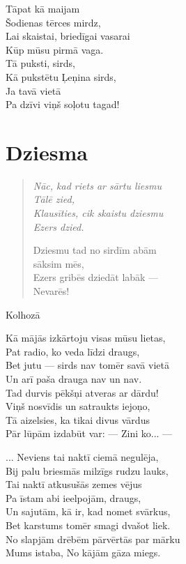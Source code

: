 \documentclass[14pt]{extarticle}
\begin{document}
{{Tāpat kā maijam\\
Šodienas tērces mirdz,\\
Lai skaistai, briedīgai vasarai\\
Kūp mūsu pirmā vaga.\\
Tā puksti, sirds,\\
Kā pukstētu Ļeņina sirds,\\
Ja tavā vietā\\
Pa dzīvi viņš soļotu tagad!




\newpage

\section{Dziesma}

\begin{quote}
{\em
Nāc, kad riets ar sārtu liesmu\\
\mbox{}\hspace{10pt} Tālē zied,\\
Klausīties, cik skaistu dziesmu\\
\mbox{}\hspace{10pt} Ezers dzied.

Dziesmu tad no sirdīm abām\\
\mbox{}\hspace{10pt} sāksim mēs,\\
Ezers gribēs dziedāt labāk ---\\
\mbox{}\hspace{10pt} Nevarēs!
}
\end{quote}


{\large \sc Kolhozā}

Kā mājās izkārtoju visas mūsu lietas,\\
Pat radio, ko veda līdzi draugs,\\
Bet jutu --- sirds nav tomēr savā vietā\\
Un arī paša drauga nav un nav.\\
Tad durvis pēkšņi atveras ar dārdu!\\
Viņš nosvīdis un satraukts iejoņo,\\
Tā aizelsies, ka tikai divus vārdus\\
Pār lūpām izdabūt var: --- Zini ko... ---

... Neviens tai naktī ciemā negulēja,\\
Bij palu briesmās milzīgs rudzu lauks,\\
Tai naktī atkusušās zemes vējus\\
Pa īstam abi ieelpojām, draugs,\\
Un sajutām, kā ir, kad nomet svārkus,\\
Bet karstums tomēr smagi dvašot liek.\\
No slapjām drēbēm pārvērtās par mārku\\
Mums istaba, No kājām gāza miegs.

}}
\end{document}
